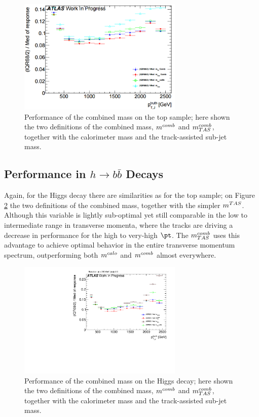 \begin{figure}[!ht]
  \centering
      \includegraphics[width=0.7\textwidth]{jet_part/mcomb/mcombtas4.png}
  \caption[$\mcombtas$ on the boosted tops]{Performance of the combined mass on the top sample; here shown the two definitions of the combined mass, $m^{comb}$ and $\mcombtas$, together with the calorimeter mass and the track-assisted sub-jet mass.}
  \label{fig:mcombtas4}
\end{figure}

\subsection{Performance in $h\to b\bar{b}$ Decays}
Again, for the Higgs decay there are similarities as for the top sample; on Figure \ref{fig:mcombtas5} the two definitions of the combined mass, together with the simpler $m^{TAS}$. Although this variable is lightly sub-optimal yet still comparable in the low to intermediate range in transverse momenta, where the tracks are driving a decrease in performance for the high to very-high $\pt$. The $\mcombtas$ uses this advantage to achieve optimal behavior in the entire transverse momentum spectrum, outperforming both $m^{calo}$ and $m^{comb}$ almost everywhere.

\begin{figure}[!ht]
  \centering
      \includegraphics[width=0.7\textwidth]{jet_part/mcomb/mcombtas5.pdf}
  \caption[$\mcombtas$ on the boosted Higgs]{Performance of the combined mass on the Higgs decay; here shown the two definitions of the combined mass, $m^{comb}$ and $\mcombtas$, together with the calorimeter mass and the track-assisted sub-jet mass.}
  \label{fig:mcombtas5}
\end{figure}

